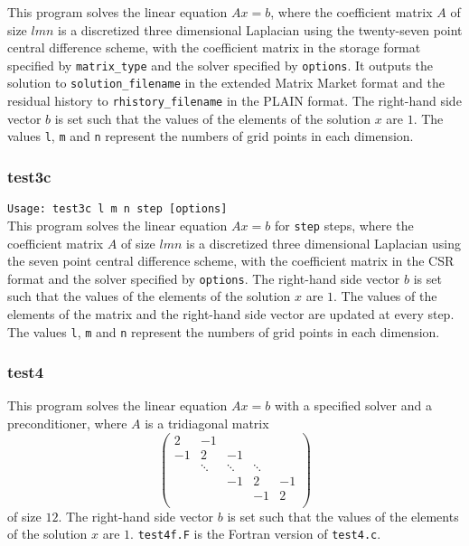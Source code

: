 \documentclass[a4paper]{article}
\begin{document}
This program solves the linear equation $Ax = b$, where the coefficient 
matrix $A$ of size $lmn$ is a discretized three dimensional 
Laplacian using the twenty-seven
point central difference scheme, with the coefficient matrix 
in the storage format specified
by \verb|matrix_type| and the solver specified by {\tt options}. 
It outputs the solution to {\tt solution\_filename} in the extended 
Matrix Market format and 
the residual history to {\tt rhistory\_filename} in the PLAIN format. 
The right-hand side vector $b$ is set such that the values of the elements of the solution $x$ are $1$. 
The values {\tt l}, {\tt m} and {\tt n} represent the numbers of grid
points in each dimension. 

\subsubsection{test3c}

\verb+Usage: test3c l m n step [options]+\\

This program solves the linear equation $Ax = b$ for {\tt step} steps,
where the coefficient 
matrix $A$ of size $lmn$ is a discretized three dimensional 
Laplacian using the seven
point central difference scheme, with the coefficient matrix 
in the CSR format and the solver specified by {\tt options}.
The right-hand side vector $b$ is set such that the values of the elements of the solution $x$ are $1$. The values of the elements of the matrix and
the right-hand side vector are updated at every step.
The values {\tt l}, {\tt m} and {\tt n} represent the numbers of grid
points in each dimension. 

\subsubsection{test4}
This program solves the linear equation $Ax = b$ with a specified 
solver and a preconditioner, where $A$ is a tridiagonal matrix
\[
\left(
\begin{array}{ccccc}
2 & -1 &   &  &   \\
-1 & 2 & -1 &  &   \\
  & \ddots  & \ddots  & \ddots  &   \\
  &   & -1 & 2 & -1 \\
  &   &   & -1 & 2 \\
\end{array}
\right)
\]
of size $12$.
The right-hand side vector $b$ is set such that  
the values of the elements of the solution $x$ are $1$. 
{\tt test4f.F} is the Fortran version of {\tt test4.c}.
\end{document}
